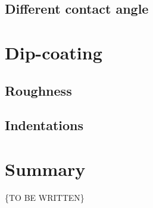 \subsection{Different contact angle}
\label{sec:re-entrant.rounding.angle}

\section{Dip-coating}
\label{sec:re-entrant.dip-coating}

\subsection{Roughness}
\label{sec:re-entrant.dip-coating.roughness}

\subsection{Indentations}
\label{sec:re-entrant.dip-coating.indentations}

\section{Summary}
\label{sec:re-entrant.summary}

\{TO BE WRITTEN\}
